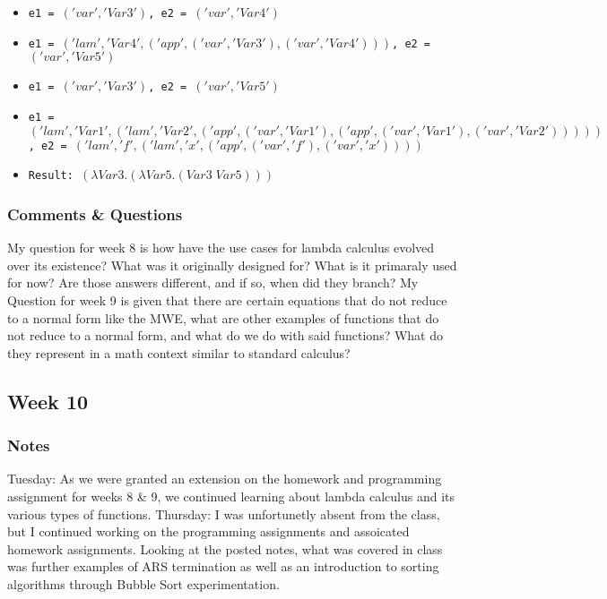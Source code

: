 \documentclass{article}
\theoremstyle{theorem}
\theoremstyle{definition}
\theoremstyle{remark}
\begin{document}
\begin{itemize}
\begin{itemize}
        \item \texttt{e1 = $('var', 'Var3')$, e2 = $('var', 'Var4')$}
        \item \texttt{e1 = $('lam', 'Var4', ('app', ('var', 'Var3'), ('var', 'Var4')))$, e2 = $('var', 'Var5')$}
        \item \texttt{e1 = $('var', 'Var3')$, e2 = $('var', 'Var5')$}
        \item \texttt{e1 = $('lam', 'Var1', ('lam', 'Var2', ('app', ('var', 'Var1'), ('app', ('var', 'Var1'), ('var', 'Var2')))))$, \newline e2 = $('lam', 'f', ('lam', 'x', ('app', ('var', 'f'), ('var', 'x'))))$}
        \item \texttt{Result: $(\lambda Var3.(\lambda Var5.(Var3\; Var5)))$}
        \end{itemize}
\end{itemize}

\subsubsection{Comments \& Questions}
My question for week 8 is how have the use cases for lambda calculus evolved over its existence? What was it originally designed for? What is it primaraly used for now? Are those answers different, and if so, when did they branch?
\newline \newline My Question for week 9 is given that there are certain equations that do not reduce to a normal form like the MWE, what are other examples of functions that do not reduce to a normal form, and what do we do with said functions? What do they represent in a math context similar to standard calculus?

\subsection{Week 10}

\subsubsection{Notes}
Tuesday: As we were granted an extension on the homework and programming assignment for weeks 8 \& 9, we continued learning about lambda calculus and its various types of functions. \newline Thursday: I was unfortunetly absent from the class, but I continued working on the programming assignments and assoicated homework assignments. Looking at the posted notes, what was covered in class was further examples of ARS termination as well as an introduction to sorting algorithms through Bubble Sort experimentation.
\end{document}
